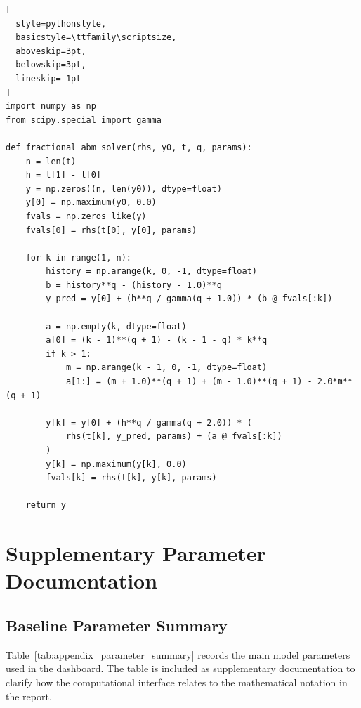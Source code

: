 \documentclass[12pt,a4paper,oneside]{report}
\begin{document}
\begin{lstlisting}[
  style=pythonstyle,
  basicstyle=\ttfamily\scriptsize,
  aboveskip=3pt,
  belowskip=3pt,
  lineskip=-1pt
]
import numpy as np
from scipy.special import gamma

def fractional_abm_solver(rhs, y0, t, q, params):
    n = len(t)
    h = t[1] - t[0]
    y = np.zeros((n, len(y0)), dtype=float)
    y[0] = np.maximum(y0, 0.0)
    fvals = np.zeros_like(y)
    fvals[0] = rhs(t[0], y[0], params)

    for k in range(1, n):
        history = np.arange(k, 0, -1, dtype=float)
        b = history**q - (history - 1.0)**q
        y_pred = y[0] + (h**q / gamma(q + 1.0)) * (b @ fvals[:k])

        a = np.empty(k, dtype=float)
        a[0] = (k - 1)**(q + 1) - (k - 1 - q) * k**q
        if k > 1:
            m = np.arange(k - 1, 0, -1, dtype=float)
            a[1:] = (m + 1.0)**(q + 1) + (m - 1.0)**(q + 1) - 2.0*m**(q + 1)

        y[k] = y[0] + (h**q / gamma(q + 2.0)) * (
            rhs(t[k], y_pred, params) + (a @ fvals[:k])
        )
        y[k] = np.maximum(y[k], 0.0)
        fvals[k] = rhs(t[k], y[k], params)

    return y
\end{lstlisting}

\chapter{Supplementary Parameter Documentation}

\section{Baseline Parameter Summary}
Table~\ref{tab:appendix_parameter_summary} records the main model parameters used in the dashboard. The table is included as supplementary documentation to clarify how the computational interface relates to the mathematical notation in the report.
\end{document}
